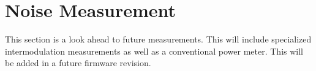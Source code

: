 \section{Noise Measurement}
This section is a look ahead to future measurements.  This will include specialized intermodulation measurements as well as a conventional power meter.  This will be added in a future firmware revision.
